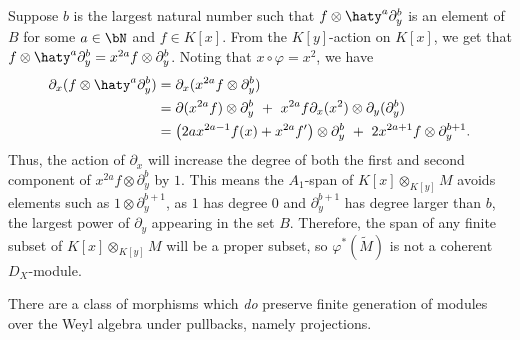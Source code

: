 \begin{example}
	Suppose $b$ is the largest natural number such that $f\otimes \haty^a\partial_y^b$ is an element of $B$ for some $a\in \bN$ and $f \in K[x]$. From the $K[y]$-action on $K[x]$, we get that $f\otimes \haty^a\partial_y^b = x^{2a}f\otimes \partial_y^b$. Noting that $x\circ \varphi = x^2$, we have
	\begin{align*}
		\partial_x(f\otimes \haty^a\partial_y^b)
		  &= \partial_x(x^{2a}f\otimes \partial_y^b) \\
		  &= \partial(x^{2a}f) \otimes \partial_y^b ~+~ x^{2a}f\partial_x(x^2)\otimes \partial_y(\partial_y^b)\\
		  &= \left(2ax^{2a-1}f(x) + x^{2a}f'\right)\otimes \partial_y^{b} ~+~ 2x^{2a+1}f\otimes \partial_y^{b+1}.
	\end{align*}
	Thus, the action of $\partial_x$ will increase the degree of both the first and second component of $x^{2a}f\otimes \partial_y^b$ by $1$. This means the $A_1$-span of $K[x]\otimes_{K[y]} M$ avoids elements such as $1\otimes \partial_y^{b+1}$, as $1$ has degree 0 and $\partial_y^{b+1}$ has degree larger than $b$, the largest power of $\partial_y$ appearing in the set $B$. Therefore, the span of any finite subset of $K[x]\otimes_{K[y]}M$ will be a proper subset, so $\varphi^*(\tilde{M})$ is not a coherent $D_X$-module.
\end{example}
There are a class of morphisms which \emph{do} preserve finite generation of modules over the Weyl algebra under pullbacks, namely projections.
